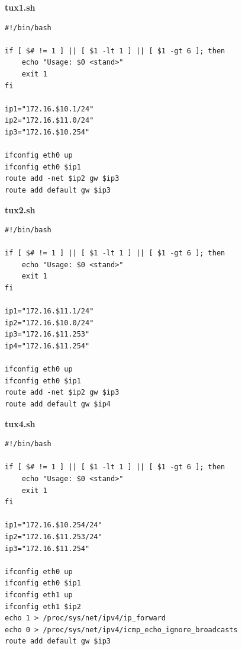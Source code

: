 \documentclass{article}
\begin{document}
\textbf{tux1.sh}
\begin{verbatim}
#!/bin/bash

if [ $# != 1 ] || [ $1 -lt 1 ] || [ $1 -gt 6 ]; then
    echo "Usage: $0 <stand>"
    exit 1
fi

ip1="172.16.$10.1/24"
ip2="172.16.$11.0/24"
ip3="172.16.$10.254"

ifconfig eth0 up
ifconfig eth0 $ip1
route add -net $ip2 gw $ip3
route add default gw $ip3
\end{verbatim}

\textbf{tux2.sh}
\begin{verbatim}
#!/bin/bash

if [ $# != 1 ] || [ $1 -lt 1 ] || [ $1 -gt 6 ]; then
    echo "Usage: $0 <stand>"
    exit 1
fi

ip1="172.16.$11.1/24"
ip2="172.16.$10.0/24"
ip3="172.16.$11.253"
ip4="172.16.$11.254"

ifconfig eth0 up
ifconfig eth0 $ip1
route add -net $ip2 gw $ip3
route add default gw $ip4
\end{verbatim}

\textbf{tux4.sh}
\begin{verbatim}
#!/bin/bash

if [ $# != 1 ] || [ $1 -lt 1 ] || [ $1 -gt 6 ]; then
    echo "Usage: $0 <stand>"
    exit 1
fi

ip1="172.16.$10.254/24"
ip2="172.16.$11.253/24"
ip3="172.16.$11.254"

ifconfig eth0 up
ifconfig eth0 $ip1
ifconfig eth1 up
ifconfig eth1 $ip2
echo 1 > /proc/sys/net/ipv4/ip_forward
echo 0 > /proc/sys/net/ipv4/icmp_echo_ignore_broadcasts
route add default gw $ip3
\end{verbatim}
\end{document}
